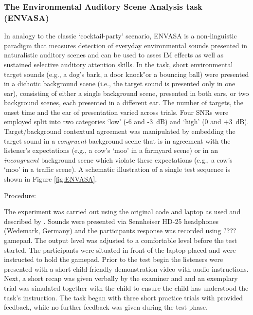 \documentclass[a4paper, twoside]{templates/ociamthesis}
\begin{document}
\hypertarget{the-environmental-auditory-scene-analysis-task-envasa}{%
\subsubsection{The Environmental Auditory Scene Analysis task (ENVASA)}\label{the-environmental-auditory-scene-analysis-task-envasa}}

In analogy to the classic `cocktail-party' scenario, ENVASA is a non-linguistic paradigm \autocite{Leech2009} that measures detection of everyday environmental sounds presented in naturalistic auditory scenes and can be used to asses IM effects as well as sustained selective auditory attention skills. In the task, short environmental target sounds (e.g., a dog's bark, a door knock"or a bouncing ball) were presented in a dichotic background scene (i.e., the target sound is presented only in one ear), consisting of either a single background scene, presented in both ears, or two background scenes, each presented in a different ear. The number of targets, the onset time and the ear of presentation varied across trials. Four SNRs were employed split into two categories `low' (-6 and -3~dB) and `high' (0 and +3~dB). Target/background contextual agreement was manipulated by embedding the target sound in a \emph{congruent} background scene that is in agreement with the listener's expectations (e.g., a cow's `moo' in a farmyard scene) or in an \emph{incongruent} background scene which violate these expectations (e.g., a cow's `moo' in a traffic scene). A schematic illustration of a single test sequence is shown in Figure \ref{fig:ENVASA}.

Procedure:

The experiment was carried out using the original code and laptop as used and described by \textcite{Leech2009}. Sounds were presented via Sennheiser HD-25 headphones (Wedemark, Germany) and the participants response was recorded using ???? gamepad. The output level was adjusted to a comfortable level before the test started. The participants were situated in front of the laptop placed and were instructed to hold the gamepad. Prior to the test begin the listeners were presented with a short child-friendly demonstration video with audio instructions. Next, a short recap was given verbally by the examiner and and an exemplary trial was simulated together with the child to ensure the child has understood the task's instruction. The task began with three short practice trials with provided feedback, while no further feedback was given during the test phase.
\end{document}
